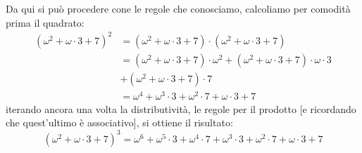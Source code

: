\begin{example}
\begin{itemize}
		Da qui si può procedere cone le regole che conosciamo, calcoliamo per comodità prima il quadrato:
		\[ \begin{split}
			(\omega^2 + \omega \cdot 3 + 7)^2 &= (\omega^2 + \omega \cdot 3 + 7) \cdot (\omega^2 + \omega \cdot 3 + 7) \\
											  &= (\omega^2 + \omega \cdot 3 + 7) \cdot \omega^2 + (\omega^2 + \omega \cdot 3 + 7) \cdot \omega \cdot 3 \\
											  &+ (\omega^2 + \omega \cdot 3 + 7) \cdot 7 \\
											  &= \omega^4 + \omega^3 \cdot 3 + \omega^2\cdot 7 + \omega \cdot 3 + 7
		\end{split}
			\]
		iterando ancora una volta la distributività, le regole per il prodotto [e ricordando che quest'ultimo è associativo], si ottiene il risultato:
		\[ (\omega^2 + \omega \cdot 3 + 7)^3 = \omega^6 + \omega^5 \cdot 3 + \omega^4 \cdot 7 + \omega^3 \cdot 3 + \omega^2\cdot 7 + \omega \cdot 3 + 7
			\]
	\end{itemize}
\end{example}